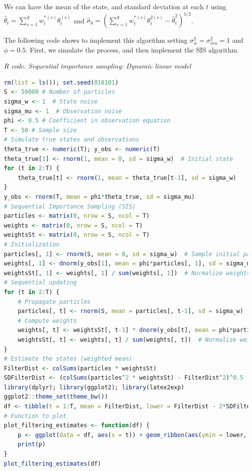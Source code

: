 We can have the mean of the state, and standard deviation at each $t$ using $\hat{\theta}_t=\sum_{s=1}^S w_t^{*(s)} \theta_t^{(s)}$ and $\hat{\sigma}_{\theta}=\left(\sum_{s=1}^S w_t^{*(s)} \theta_t^{2(s)}-\hat{\theta}_t^2\right)^{1/2}$.

The following code shows to implement this algorithm setting $\sigma_w^2=\sigma_{mu}^2=1$ and $\phi=0.5$. First, we simulate the process, and then implement the SIS algorithm.

\begin{tcolorbox}[enhanced,width=4.67in,center upper,
	fontupper=\large\bfseries,drop shadow southwest,sharp corners]
	\textit{R code. Sequential importance sampling: Dynamic linear model}
	\begin{VF}
		\begin{lstlisting}[language=R]
rm(list = ls()); set.seed(010101)
S <- 50000 # Number of particles
sigma_w <- 1  # State noise
sigma_mu <- 1  # Observation noise
phi <- 0.5 # Coefficient in observation equation
T <- 50 # Sample size
# Simulate true states and observations
theta_true <- numeric(T); y_obs <- numeric(T)
theta_true[1] <- rnorm(1, mean = 0, sd = sigma_w)  # Initial state
for (t in 2:T) {
	theta_true[t] <- rnorm(1, mean = theta_true[t-1], sd = sigma_w)
}
y_obs <- rnorm(T, mean = phi*theta_true, sd = sigma_mu)
# Sequential Importance Sampling (SIS)
particles <- matrix(0, nrow = S, ncol = T) 
weights <- matrix(0, nrow = S, ncol = T) 
weightsSt <- matrix(0, nrow = S, ncol = T) 
# Initialization
particles[, 1] <- rnorm(S, mean = 0, sd = sigma_w)  # Sample initial particles
weights[, 1] <- dnorm(y_obs[1], mean = phi*particles[, 1], sd = sigma_mu)  # Importance weights
weightsSt[, 1] <- weights[, 1] / sum(weights[, 1])  # Normalize weights
# Sequential updating
for (t in 2:T) {
	# Propagate particles
	particles[, t] <- rnorm(S, mean = particles[, t-1], sd = sigma_w)
	# Compute weights
	weights[, t] <- weightsSt[, t-1] * dnorm(y_obs[t], mean = phi*particles[, t], sd = sigma_mu) # Recursive weight update
	weightsSt[, t] <- weights[, t] / sum(weights[, t])  # Normalize weights
}
# Estimate the states (weighted mean)
FilterDist <- colSums(particles * weightsSt)
SDFilterDist <- (colSums(particles^2 * weightsSt) - FilterDist^2)^0.5
library(dplyr); library(ggplot2); library(latex2exp)
ggplot2::theme_set(theme_bw())
df <- tibble(t = 1:T, mean = FilterDist, lower = FilterDist - 2*SDFilterDist, upper = FilterDist + 2*SDFilterDist, theta_true = theta_true)
# Function to plot
plot_filtering_estimates <- function(df) {
	p <- ggplot(data = df, aes(x = t)) + geom_ribbon(aes(ymin = lower, ymax = upper), alpha = 1, fill = "lightblue") + geom_line(aes(y = theta_true), colour = "black", alpha = 1, linewidth = 0.5) + geom_line(aes(y = mean), colour = "blue", linewidth = 0.5) + ylab(TeX("$\\theta_{t}$")) + xlab("Time")
	print(p)
}
plot_filtering_estimates(df)
\end{lstlisting}
	\end{VF}
\end{tcolorbox} 

